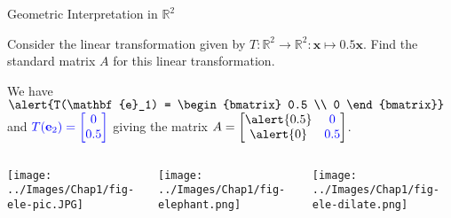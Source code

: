 \documentclass[xcoler=dvipsnames, aspectratio=169]{beamer}
\begin{document}
\begin{frame}{Geometric Interpretation in $\mathbb{R}^2$}

Consider the linear transformation given by $T: \mathbb{R}^2 \to \mathbb{R}^2: \mathbf{x} \mapsto 0.5 \mathbf{x}$. Find the standard matrix $A$ for this linear transformation. \bs

We have  $\dsty \alert{T(\mathbf{e}_1) = \begin{bmatrix} 0.5 \\ 0 \end{bmatrix}}$ and $\displaystyle \textcolor{blue}{T(\mathbf{e}_2) = \begin{bmatrix} 0 \\ 0.5 \end{bmatrix}}$ giving the matrix $\dsty A = \begin{bmatrix} \alert{0.5} & \colorb{0} \\ \alert{0} & \colorb{0.5} \end{bmatrix}$.

\begin{columns}

\column{0.33\tw}

\begin{center}
\texttt{[image: ../Images/Chap1/fig-ele-pic.JPG]}
\end{center}

\column{0.33\tw}

\begin{center}
\texttt{[image: ../Images/Chap1/fig-elephant.png]}
\end{center}

\column{0.33\tw}

\begin{center}
\texttt{[image: ../Images/Chap1/fig-ele-dilate.png]}
\end{center}

\end{columns}

\end{frame}
\end{document}
